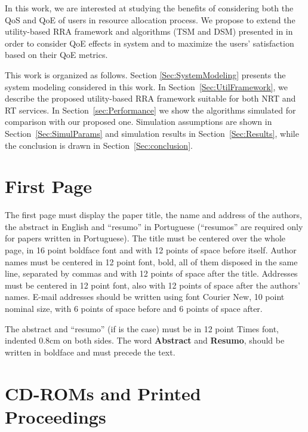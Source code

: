 \documentclass[12pt]{article}
\newcommand{\SecRef}[1]{Section~\ref{#1}}
\begin{document}
In this work, we are interested at studying the benefits of considering both the \ac{QoS} and \ac{QoE} of users in resource allocation process. We propose to extend the utility-based \ac{RRA} framework and algorithms (\ac{TSM} and \ac{DSM}) presented in \cite{Rodrigues2014_Wiley} in order to consider \ac{QoE} effects in system and to maximize the users' satisfaction based on their \ac{QoE} metrics.


This work is organized as follows. Section \ref{Sec:SystemModeling} presents the system modeling considered in this work. In \SecRef{Sec:UtilFramework}, we describe the proposed utility-based \ac{RRA} framework suitable for both \ac{NRT} and \ac{RT} services. In \SecRef{sec:Performance} we show the algorithms simulated for comparison with our proposed one. Simulation assumptions are shown in \SecRef{Sec:SimulParams} and simulation results in \SecRef{Sec:Results}, while the conclusion is drawn in \SecRef{Sec:conclusion}.


\section{First Page} \label{sec:firstpage}

The first page must display the paper title, the name and address of the
authors, the abstract in English and ``resumo'' in Portuguese (``resumos'' are
required only for papers written in Portuguese). The title must be centered
over the whole page, in 16 point boldface font and with 12 points of space
before itself. Author names must be centered in 12 point font, bold, all of
them disposed in the same line, separated by commas and with 12 points of
space after the title. Addresses must be centered in 12 point font, also with
12 points of space after the authors' names. E-mail addresses should be
written using font Courier New, 10 point nominal size, with 6 points of space
before and 6 points of space after.

The abstract and ``resumo'' (if is the case) must be in 12 point Times font,
indented 0.8cm on both sides. The word \textbf{Abstract} and \textbf{Resumo},
should be written in boldface and must precede the text.

\section{CD-ROMs and Printed Proceedings}
\end{document}
